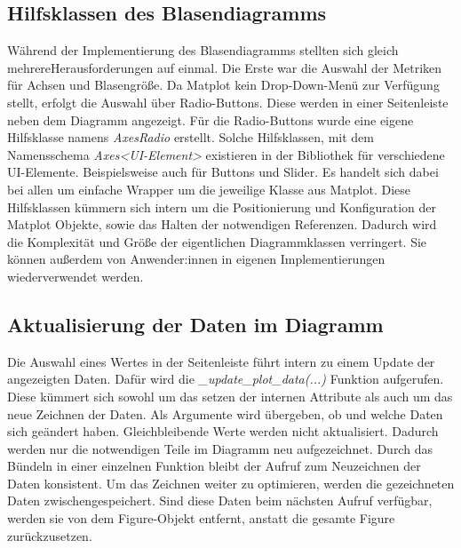 \subsection{Hilfsklassen des Blasendiagramms}
\label{subsec:impl_linien_helper}
Während der Implementierung des Blasendiagramms stellten sich gleich mehrere\linebreak Herausforderungen auf einmal. Die Erste war die Auswahl der Metriken für Achsen und Blasengröße. Da Matplot kein Drop-Down-Menü zur Verfügung stellt, erfolgt die Auswahl über Radio-Buttons. Diese werden in einer Seitenleiste neben dem Diagramm angezeigt. Für die Radio-Buttons wurde eine eigene Hilfsklasse namens \emph{AxesRadio} erstellt. Solche Hilfsklassen, mit dem Namensschema \emph{Axes<UI-Element>} existieren in der Bibliothek für verschiedene UI-Elemente. Beispielsweise auch für Buttons und Slider. Es handelt sich dabei bei allen um einfache Wrapper um die jeweilige Klasse aus Matplot. Diese Hilfsklassen kümmern sich intern um die Positionierung und Konfiguration der Matplot Objekte, sowie das Halten der notwendigen Referenzen. Dadurch wird die Komplexität und Größe der eigentlichen Diagrammklassen verringert. Sie können außerdem von Anwender:innen in eigenen Implementierungen wiederverwendet werden.

\subsection{Aktualisierung der Daten im Diagramm}
\label{subsec:impl_bubble_data_update}
\noindent Die Auswahl eines Wertes in der Seitenleiste führt intern zu einem Update der angezeigten Daten. Dafür wird die \emph{\_update\_plot\_data(...)} Funktion aufgerufen. Diese kümmert sich sowohl um das setzen der internen Attribute als auch um das neue Zeichnen der Daten. Als Argumente wird übergeben, ob und welche Daten sich geändert haben. Gleichbleibende Werte werden nicht aktualisiert. Dadurch werden nur die notwendigen Teile im Diagramm neu aufgezeichnet. Durch das Bündeln in einer einzelnen Funktion bleibt der Aufruf zum Neuzeichnen der Daten konsistent. Um das Zeichnen weiter zu optimieren, werden die gezeichneten Daten zwischengespeichert. Sind diese Daten beim nächsten Aufruf verfügbar, werden sie von dem Figure-Objekt entfernt, anstatt die gesamte Figure zurückzusetzen.

